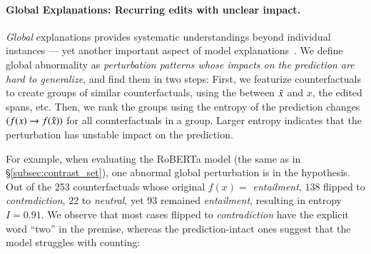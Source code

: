\paragraph{Global Explanations: Recurring edits with unclear impact.}
\label{subsec:global_exp}
\emph{Global} explanations provides systematic understandings beyond individual instances --- yet another important aspect of model explanations~\cite{miller}.
We define global abnormality as \emph{perturbation patterns whose impacts on the prediction are hard to generalize}, and find them in two steps:
First, we featurize counterfactuals to create groups of similar counterfactuals, using the \tagstr between $\hat{x}$ and $x$, the edited spans, etc.
Then, we rank the groups using the entropy of the prediction changes $(f(x) \rightarrow f(\hat{x}))$ for all counterfactuals in a group.
Larger entropy indicates that the perturbation has unstable impact on the prediction.

For example, when evaluating the \nli RoBERTa model (the same as in \S\ref{subsec:contrast_set}), one abnormal global perturbation is  in the hypothesis.
Out of the 253 counterfactuals whose original $f(x)=$ \emph{entailment}, $138$ flipped to \emph{contradiction}, $22$ to \emph{neutral}, yet $93$ remained \emph{entailment}, resulting in entropy $I=0.91$.
We observe that most cases flipped to \emph{contradiction} have the explicit word ``two'' in the premise, whereas the prediction-intact ones suggest that the model struggles with counting:



